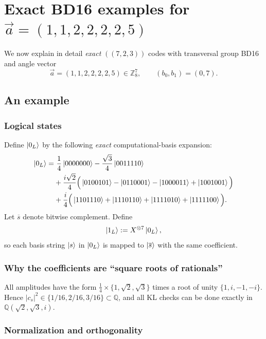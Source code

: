 \documentclass[11pt]{article}
\begin{document}


\section{Exact BD16 examples for \(\vec a=(1,1,2,2,2,2,5)\)}

We now explain in detail \emph{exact} \(((7,2,3))\) codes with transversal group BD16 and angle vector
\[
\vec a=(1,1,2,2,2,2,5)\in\mathbb{Z}_8^7,\qquad (b_0,b_1)=(0,7).
\]

\subsection{An example}

\subsubsection{Logical states}

Define \(\ket{0_L}\) by the following \emph{exact} computational-basis expansion:
\[
\begin{aligned}
\ket{0_L}
=&\ \frac{1}{4}\ket{0000000}
-\frac{\sqrt{3}}{4}\ket{0011110}\\
&+\frac{i\sqrt{2}}{4}\Big(
\ket{0100101}-\ket{0110001}-\ket{1000011}+\ket{1001001}
\Big)\\
&+\frac{i}{4}\Big(
\ket{1101110}+\ket{1110110}+\ket{1111010}+\ket{1111100}
\Big).
\end{aligned}
\]
Let \(\overline{s}\) denote bitwise complement. Define
\[
\ket{1_L}:=X^{\otimes 7}\ket{0_L},
\]
so each basis string \(\ket{s}\) in \(\ket{0_L}\) is mapped to \(\ket{\overline{s}}\) with the same coefficient.

\subsubsection{Why the coefficients are ``square roots of rationals''}

All amplitudes have the form \(\frac{1}{4}\times \{1,\sqrt{2},\sqrt{3}\}\) times a root of unity \(\{1,i,-1,-i\}\).
Hence \(|c_s|^2\in \{1/16,2/16,3/16\}\subset \mathbb{Q}\), and all KL checks can be done exactly in \(\mathbb{Q}(\sqrt{2},\sqrt{3},i)\).

\subsubsection{Normalization and orthogonality}
\end{document}
